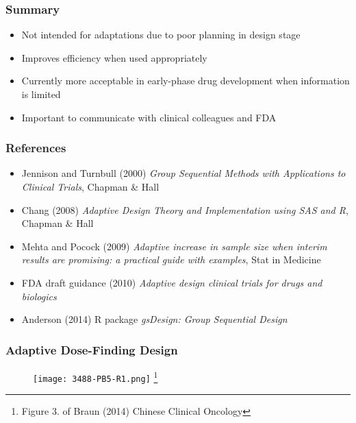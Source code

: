 \documentclass{beamer}
\begin{document}
\begin{frame}
  \frametitle{Summary}
\begin{itemize}
  \item Not intended for adaptations due to poor planning in design stage
  \item Improves efficiency when used appropriately
  \item Currently more acceptable in early-phase drug development when information is limited
  \item Important to communicate with clinical colleagues and FDA
\end{itemize}
\end{frame}
\begin{frame}
	\frametitle{References}
\begin{itemize}
\item Jennison and Turnbull (2000) \emph{Group Sequential Methods with Applications to Clinical Trials}, Chapman \& Hall 

\item Chang (2008) \emph{Adaptive Design Theory and Implementation using SAS and R},  Chapman \& Hall 

\item Mehta and Pocock (2009) \emph{Adaptive increase in sample size when interim results are promising: a practical guide with examples}, Stat in Medicine

\item FDA draft guidance (2010) \emph{Adaptive design clinical trials for drugs and biologics}

\item Anderson (2014) R package \emph{gsDesign: Group Sequential Design}

\end{itemize}
	
\end{frame}

\appendix
\begin{frame}
	\frametitle{Adaptive Dose-Finding Design}
	\begin{figure}
		\begin{center}
			\texttt{[image: 3488-PB5-R1.png]}
			\footnote[]{Figure 3. of Braun (2014) Chinese Clinical Oncology}
		\end{center}
	\end{figure}
\end{frame}
\end{document}
